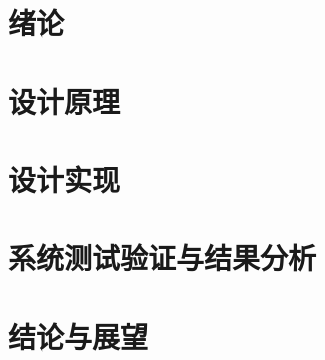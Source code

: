 \documentclass[11pt]{article}
\begin{document}

% 




\newpage
\tableofcontents
\thispagestyle{empty}%


\newpage
\setcounter{page}{1}%
\section{绪论}


\newpage
\section{设计原理}


\newpage
\section{设计实现}


\newpage
\section{系统测试验证与结果分析}


\newpage
\section{结论与展望}



%     

\newpage
\end{document}
